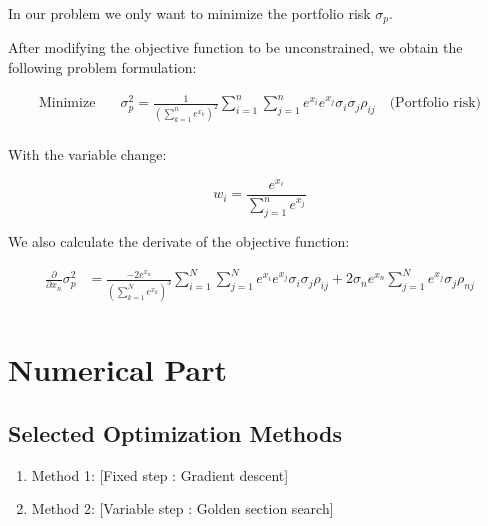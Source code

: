 \documentclass[12pt]{article}
\begin{document}
In our problem we only want to minimize the portfolio risk $\sigma_p$.



After modifying the objective function to be unconstrained, we obtain the following problem formulation:

\begin{equation}
    \begin{aligned}
        \text{Minimize} \quad   & \sigma_p^2 = \frac{1}{(\sum_{k=1}^{n} e^{x_k})^{2}} \sum_{i=1}^{n}\sum_{j=1}^{n} e^{x_i} e^{x_j}\sigma_i \sigma_j \rho_{ij} \quad \text{(Portfolio risk)} \\
    \end{aligned}
\end{equation}

With the variable change:

\begin{equation}
    w_i = \frac{e^{x_i}}{\sum_{j=1}^{n} e^{x_j}}
\end{equation}

We also calculate the derivate of the objective function:

\begin{equation}
    \begin{aligned}
        \frac{\partial}{\partial x_n} \sigma_p^2 & = \frac{-2 e^{x_n}}{(\sum_{k=1}^{N} e^{x_k})^{3}} \sum_{i=1}^{N}\sum_{j=1}^{N} e^{x_i} e^{x_j}\sigma_i \sigma_j \rho_{ij} + 2 \sigma_n e^{x_n} \sum_{j=1}^{N} e^{x_j}\sigma_j \rho_{nj} \\
    \end{aligned}
\end{equation}

\section*{Numerical Part}

\subsection*{Selected Optimization Methods}





\begin{enumerate}
    \item Method 1: [Fixed step : Gradient descent]
    \item Method 2: [Variable step : Golden section search]
\end{enumerate}
\end{document}

